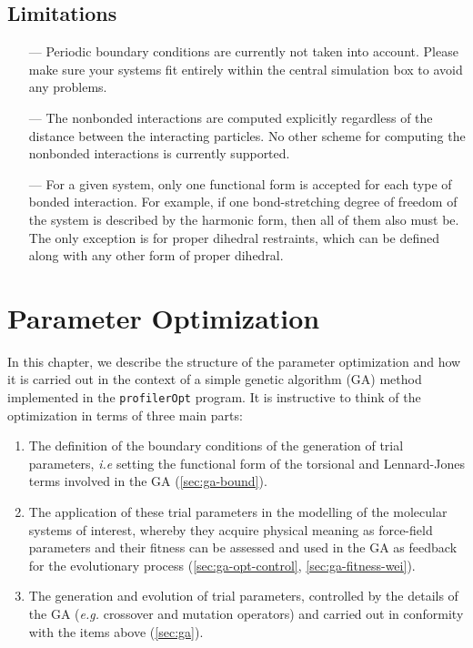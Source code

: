 \documentclass[10pt,a4paper,openany]{memoir}
\numberwithin{equation}{section}
\newcommand{\profileropt}[0]{\texttt{profilerOpt}}
\begin{document}

\section{Limitations}
\label{sec:limitations}

\begin{itemize}
\item[---] Periodic boundary conditions are currently not taken into
  account. Please make sure your systems fit entirely within the
  central simulation box to avoid any problems.
\item[---] The nonbonded interactions are computed explicitly
  regardless of the distance between the interacting particles. No
  other scheme for computing the nonbonded interactions is currently
  supported.
\item[---] For a given system, only one functional form is accepted
  for each type of bonded interaction. For example, if one
  bond-stretching degree of freedom of the system is described by the
  harmonic form, then all of them also must be. The only exception is
  for proper dihedral restraints, which can be defined along with any
  other form of proper dihedral.
\end{itemize}

\chapter{Parameter Optimization}
\label{chap:ga}

In this chapter, we describe the structure of the parameter
optimization and how it is carried out in the context of a simple
genetic algorithm (GA) method implemented in the \profileropt{}
program. It is instructive to think of the optimization in terms of
three main parts:
\begin{enumerate}
\item The definition of the boundary conditions of the generation of
  trial parameters, \textit{i.e} setting the functional form of the
  torsional and Lennard-Jones terms involved in the GA
  (\autoref{sec:ga-bound}).

\item The application of these trial parameters in the modelling of
  the molecular systems of interest, whereby they acquire physical
  meaning as force-field parameters and their fitness can be assessed
  and used in the GA as feedback for the evolutionary process
  (\autoref{sec:ga-opt-control}, \autoref{sec:ga-fitness-wei}).
  
\item The generation and evolution of trial parameters, controlled by
  the details of the GA (\textit{e.g.} crossover and mutation operators)
  and carried out in conformity with the items above
  (\autoref{sec:ga}).
\end{enumerate}
\end{document}
